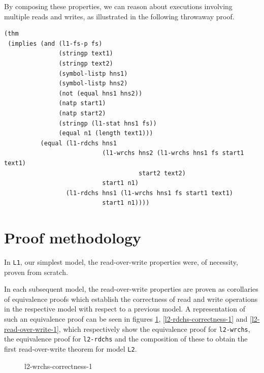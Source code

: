 \documentclass[runningheads,a4paper]{llncs}
\begin{document}
By composing these properties, we can reason about executions
involving multiple reads and writes, as illustrated in the following
throwaway proof.

\medskip

\noindent
\begin{verbatim}
(thm
 (implies (and (l1-fs-p fs)
               (stringp text1)
               (stringp text2)
               (symbol-listp hns1)
               (symbol-listp hns2)
               (not (equal hns1 hns2))
               (natp start1)
               (natp start2)
               (stringp (l1-stat hns1 fs))
               (equal n1 (length text1)))
          (equal (l1-rdchs hns1
                           (l1-wrchs hns2 (l1-wrchs hns1 fs start1 text1)
                                     start2 text2)
                           start1 n1)
                 (l1-rdchs hns1 (l1-wrchs hns1 fs start1 text1)
                           start1 n1))))
\end{verbatim}

\section{Proof methodology}

In \texttt{L1}, our simplest model, the read-over-write properties
were, of necessity, proven from scratch.

In each subsequent model, the read-over-write properties are proven as
corollaries of equivalence proofs which establish the correctness of
read and write operations in the respective model with respect to a
previous model. A representation of such an equivalence proof can be
seen in figures \ref{l2-wrchs-correctness-1},
\ref{l2-rdchs-correctness-1} and \ref{l2-read-over-write-1}, which
respectively show the equivalence proof for \texttt{l2-wrchs}, the
equivalence proof for \texttt{l2-rdchs} and the composition of these
to obtain the first read-over-write theorem for model \texttt{L2}.


\begin{figure}
  \centering
  \caption{l2-wrchs-correctness-1}
  \label{l2-wrchs-correctness-1}
\end{figure}
\end{document}
